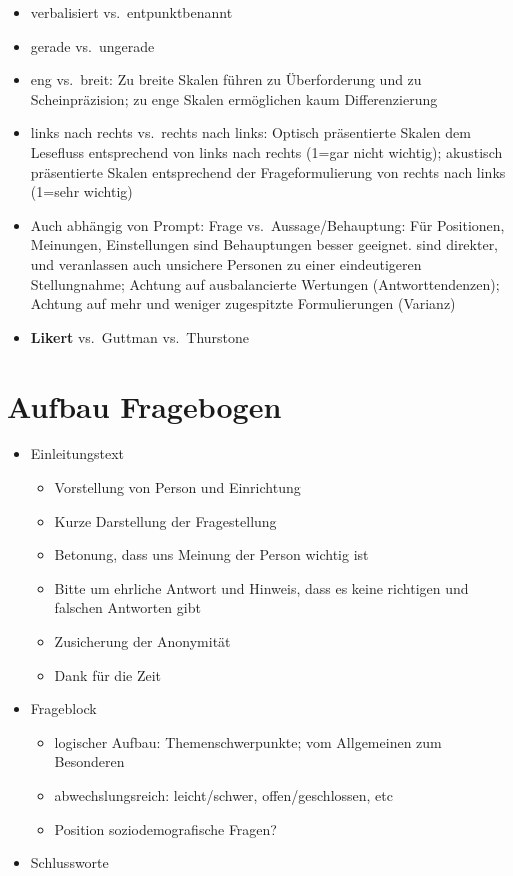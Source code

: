 \documentclass[
]{book}
\providecommand{\tightlist}{%
  \setlength{\itemsep}{0pt}\setlength{\parskip}{0pt}}
\begin{document}
\begin{itemize}
\tightlist
\item
  verbalisiert vs.~entpunktbenannt
\item
  gerade vs.~ungerade
\item
  eng vs.~breit: Zu breite Skalen führen zu Überforderung und zu Scheinpräzision; zu enge Skalen ermöglichen kaum Differenzierung
\item
  links nach rechts vs.~rechts nach links: Optisch präsentierte Skalen dem Lesefluss entsprechend von links nach rechts (1=gar nicht wichtig); akustisch präsentierte Skalen entsprechend der Frageformulierung von rechts nach links (1=sehr wichtig)
\item
  Auch abhängig von Prompt: Frage vs.~Aussage/Behauptung: Für Positionen, Meinungen, Einstellungen sind Behauptungen besser geeignet. sind direkter, und veranlassen auch unsichere Personen zu einer eindeutigeren Stellungnahme; Achtung auf ausbalancierte Wertungen (Antworttendenzen); Achtung auf mehr und weniger zugespitzte Formulierungen (Varianz)
\item
  \textbf{Likert} vs.~Guttman vs.~Thurstone
\end{itemize}

\hypertarget{aufbau-fragebogen}{%
\section{Aufbau Fragebogen}\label{aufbau-fragebogen}}

\begin{itemize}
\tightlist
\item
  Einleitungstext

  \begin{itemize}
  \tightlist
  \item
    Vorstellung von Person und Einrichtung
  \item
    Kurze Darstellung der Fragestellung
  \item
    Betonung, dass uns Meinung der Person wichtig ist
  \item
    Bitte um ehrliche Antwort und Hinweis, dass es keine richtigen und falschen Antworten gibt
  \item
    Zusicherung der Anonymität
  \item
    Dank für die Zeit
  \end{itemize}
\item
  Frageblock

  \begin{itemize}
  \tightlist
  \item
    logischer Aufbau: Themenschwerpunkte; vom Allgemeinen zum Besonderen
  \item
    abwechslungsreich: leicht/schwer, offen/geschlossen, etc
  \item
    Position soziodemografische Fragen?
  \end{itemize}
\item
  Schlussworte
\end{itemize}
\end{document}
